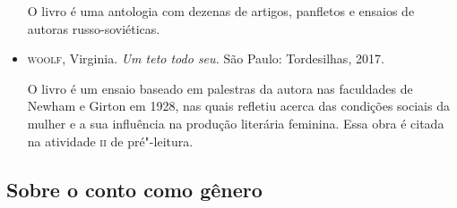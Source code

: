 \documentclass[11pt]{extarticle}
\begin{document}
\begin{itemize}
O livro é uma antologia com dezenas de artigos, panfletos e ensaios de autoras russo-soviéticas.

\item \textsc{woolf}, Virginia. \emph{Um teto todo seu.} São Paulo: Tordesilhas, 2017.

O livro é um ensaio baseado em palestras da autora nas faculdades de Newham e Girton em 1928, nas quais refletiu acerca das condições sociais da mulher e a sua influência na produção literária feminina. Essa obra é citada na atividade \textsc{ii} de pré"-leitura.
\end{itemize}

\subsection{Sobre o conto como gênero}
\end{document}
